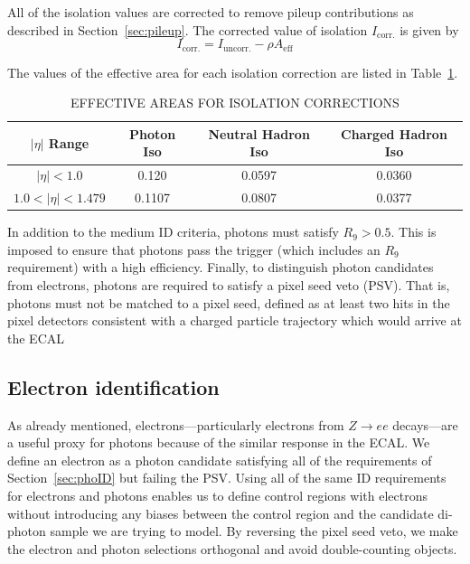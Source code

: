 All of the isolation values are corrected to remove pileup contributions as described in Section~\ref{sec:pileup}. The corrected value of isolation $I_{\mathrm{corr.}}$ is given by 
\begin{equation}
I_{\mathrm{corr.}} = I_{\mathrm{uncorr.}} - \rho A_{\mathrm{eff}}
\end{equation}

The values of the effective area for each isolation correction are listed in Table~\ref{tab:EA}.

\begin{table}[ht]
    \caption{EFFECTIVE AREAS FOR ISOLATION CORRECTIONS}
    \centering
    \begin{tabular}{ | c | c c c |}
        \hline
        	\hline
        \textbf{$|\eta|$ Range} & \textbf{Photon Iso} & \textbf{Neutral Hadron Iso} & \textbf{Charged Hadron Iso} \\ [0.5ex]
        \hline
        	$|\eta| < 1.0 $                 & 0.120   &  0.0597 & 0.0360\\
	$ 1.0 < |\eta| < 1.479 $   & 0.1107 & 0.0807 & 0.0377 \\
		 \hline
           \hline
    \end{tabular}
    \label{tab:EA}
\end{table}


In addition to the medium ID criteria, photons must satisfy $R_9 > 0.5$. This is imposed to ensure that photons pass the trigger (which includes an $R_9$ requirement) with a high efficiency. Finally, to distinguish photon candidates from electrons, photons are required to satisfy a pixel seed veto (PSV). That is, photons must not be matched to a pixel seed, defined as at least two hits in the pixel detectors consistent with a charged particle trajectory which would arrive at the ECAL 

\subsection{Electron identification}
\label{sec:eleID}
As already mentioned, electrons---particularly electrons from $Z\rightarrow ee$ decays---are a useful proxy for photons because of the similar response in the ECAL. We define an electron as a photon candidate satisfying all of the requirements of Section~\ref{sec:phoID} but failing the PSV. Using all of the same ID requirements for electrons and photons enables us to define control regions with electrons without introducing any biases between the control region and the candidate di-photon sample we are trying to model. By reversing the pixel seed veto, we make the electron and photon selections orthogonal and avoid double-counting objects.

